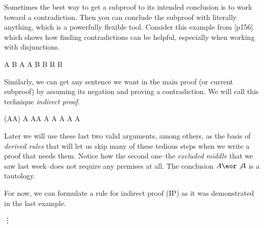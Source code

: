 Sometimes the best way to get a subproof to its intended conclusion is to work
toward a contradiction. Then you can conclude the subproof with literally
anything, which is a powerfully flexible tool. Consider this example from
\cite{Mag25}[p156] which shows how finding contradictions can be helpful,
especially when working with disjunctions.

\begin{fitchproof}
   {A \eor B}   
   {\enot A}   
  \open
   {A}
   {\ebot}     
   {B}         
  \close
  \open
   {B}
   {B}         
  \close
   {B}         
\end{fitchproof}      

Similarly, we can get any sentence we want in the main proof (or current
subproof) by assuming its negation and proving a contradiction. We will call
this technique \emph{indirect proof}.

\begin{fitchproof}
  \open
   {\enot(A\eor\enot A)} 
  \open
   {A}                   
   {A\eor\enot A}        
   {\ebot}               
  \close
   {\enot A}             
   {A \eor\enot A}       
   {\ebot}               
  \close
   {A \eor\enot A}        

\end{fitchproof}      

Later we will use these last two valid arguments, among others, as the basis of
\emph{derived rules} that will let us skip many of these tedious steps when
we write a proof that needs them. Notice how the second one--the
\emph{excluded middle} that we saw last week--does not require any premises at
all. The conclusion $A\eor\not A$ is a tautology.

For now, we can formulate a rule for indirect proof (IP) as it was demonstrated
in the last example.

\begin{fitchrule}
  \label{def:indirect-proof-rule}
  \leavevmode
  \vspace{-0.9\baselineskip}
  \begin{fitchproof}
    \open
     {\enot\ephi} 
     {\vdots}
     {\ebot}
    \close
     {\phi}       
  \end{fitchproof}      
\end{fitchrule}


